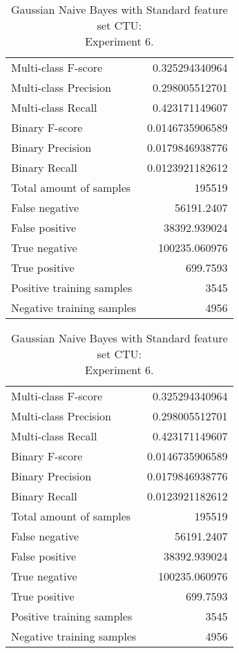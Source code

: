 \begin{table}[H]
\begin{minipage}{0.5\textwidth}
\caption{Gaussian Naive Bayes with Standard feature set CTU: \\Experiment 5.}
\centering
\begin{tabular}{l r}
\toprule
Multi-class F-score & 0.325294340964 \\
Multi-class Precision & 0.298005512701 \\
Multi-class Recall & 0.423171149607 \\
\midrule
Binary F-score & 0.0146735906589 \\
Binary Precision & 0.0179846938776 \\
Binary Recall & 0.0123921182612 \\
\midrule
Total amount of samples & 195519 \\
False negative & 56191.2407 \\
False positive & 38392.939024 \\
True negative & 100235.060976 \\
True positive & 699.7593 \\
\midrule
Positive training samples & 3545 \\
Negative training samples & 4956 \\
\bottomrule
\end{tabular}
\end{minipage}
\hfillx
\begin{minipage}{0.5\textwidth}
\caption{Gaussian Naive Bayes with Standard feature set CTU: \\Experiment 6.}
\centering
\begin{tabular}{l r}
\toprule
Multi-class F-score & 0.325294340964 \\
Multi-class Precision & 0.298005512701 \\
Multi-class Recall & 0.423171149607 \\
\midrule
Binary F-score & 0.0146735906589 \\
Binary Precision & 0.0179846938776 \\
Binary Recall & 0.0123921182612 \\
\midrule
Total amount of samples & 195519 \\
False negative & 56191.2407 \\
False positive & 38392.939024 \\
True negative & 100235.060976 \\
True positive & 699.7593 \\
\midrule
Positive training samples & 3545 \\
Negative training samples & 4956 \\
\bottomrule
\end{tabular}
\end{minipage}
\end{table}

